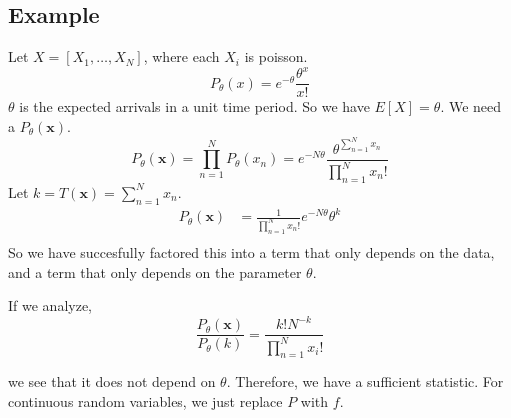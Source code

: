 \documentclass[a4paper]{article}
\begin{document}
\subsection*{Example}%
Let $X = [X_1, \dots, X_N]$, where each $X_i$ is poisson.
\[
  P_{\theta}(x) = e^{-\theta} \frac{\theta^x}{x!}
\]
$\theta$ is the expected arrivals in a unit time period. So we have $E[X] = \theta$. We need a $P_{\theta}(\mathbf{x})$.
\[
  P_{\theta}(\mathbf{x}) = \prod_{n=1}^N P_{\theta}(x_n) = e^{-N\theta}  \frac{\theta^{\sum_{n=1}^N x_n}}{\prod_{n=1}^N x_n!}
\]
Let $k = T(\mathbf{x}) = \sum_{n=1}^N x_n$. 
\[
  \begin{aligned}
    P_{\theta}(\mathbf{x}) &= \frac{1}{\prod_{n=1}^N x_n!} e^{-N \theta} \theta^k \\
  \end{aligned}
\]
So we have succesfully factored this into a term that only depends on the data, and a term that only depends on the parameter $\theta$.

If we analyze, 
\[
  \frac{P_{\theta}(\mathbf{x})}{P_{\theta}(k)} = \frac{k! N^{-k}}{\prod_{n=1}^N x_i!}
\]

we see that it does not depend on $\theta$. Therefore, we have a sufficient statistic. For continuous random variables, we just replace $P$ with $f$.
\end{document}
